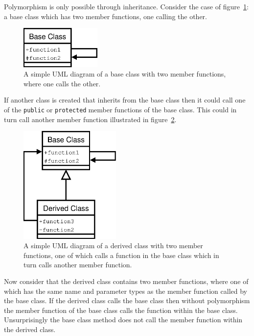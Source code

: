 \documentclass[11pt,a4paper]{scrartcl}
\def\public{\texttt{public}$\;$}
\def\protected{\texttt{protected}$\;$}
\begin{document}
Polymorphism is only possible through inheritance.  Consider the case
of figure~\ref{figure:baseonly}: a base class which has two member
functions, one calling the other.
%
\begin{figure}[h]
\begin{center}
\includegraphics[width=4cm]{figures/base_class_only.eps}
\caption{A simple UML diagram of a base class with two member functions, where one calls the other.
\label{figure:baseonly}}
\end{center}
\end{figure}
%
If another class is created that inherits from the base class
then it could call one of the \public or \protected member functions
of the base class.  This could in turn call another member function
illustrated in figure~\ref{figure:nopolymorphism}.
%
\begin{figure}[h]
\begin{center}
\includegraphics[width=5cm]{figures/no_polymorphism.eps}
\caption{A simple UML diagram of a derived class with two member functions, one of which calls a function in the base class which in turn calls another member function.
\label{figure:nopolymorphism}}
\end{center}
\end{figure}
%
Now consider that the derived class contains two member functions,
where one of which has the same name and parameter types as the member
function called by the base class.  If the derived class calls the
base class then without polymorphism the member function of the base
class calls the function within the base class.  Unsurprisingly the
base class method does not call the member function within the derived
class.
\end{document}
